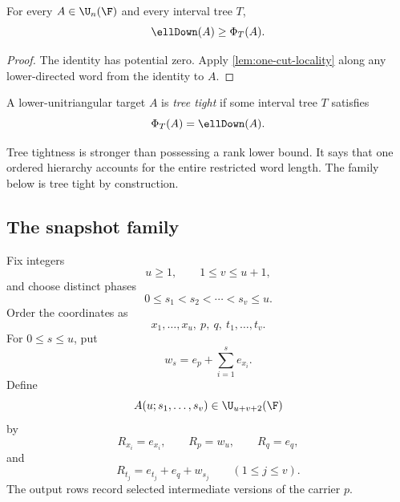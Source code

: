 \begin{corollary}\label{cor:tree-lower-bound}
For every $A\in\U_n(\F)$ and every interval tree $T$,
\[
\ellDown(A)\ge\Phi_T(A).
\]
\end{corollary}

\begin{proof}
The identity has potential zero.  Apply \cref{lem:one-cut-locality} along any lower-directed word from the identity to $A$.
\end{proof}

\begin{definition}\label{def:tree-tight}
A lower-unitriangular target $A$ is \emph{tree tight} if some interval tree $T$ satisfies
\[
\Phi_T(A)=\ellDown(A).
\]
\end{definition}

Tree tightness is stronger than possessing a rank lower bound.  It says that one ordered hierarchy accounts for the entire restricted word length.  The family below is tree tight by construction.

\subsection{The snapshot family}

Fix integers
\[
u\ge1,
\qquad
1\le v\le u+1,
\]
and choose distinct phases
\[
0\le s_1<s_2<\cdots<s_v\le u.
\]
Order the coordinates as
\[
x_1,\ldots,x_u,\ p,\ q,\ t_1,\ldots,t_v.
\]
For $0\le s\le u$, put
\begin{equation}\label{eq:prefix-state}
w_s=e_p+\sum_{i=1}^{s}e_{x_i}.
\end{equation}
Define
\begin{equation}\label{eq:snapshot-target}
A(u;s_1,\ldots,s_v)\in\U_{u+v+2}(\F)
\end{equation}
by
\[
R_{x_i}=e_{x_i},
\qquad
R_p=w_u,
\qquad
R_q=e_q,
\]
and
\begin{equation}\label{eq:snapshot-output}
R_{t_j}=e_{t_j}+e_q+w_{s_j}
\qquad(1\le j\le v).
\end{equation}
The output rows record selected intermediate versions of the carrier $p$.

